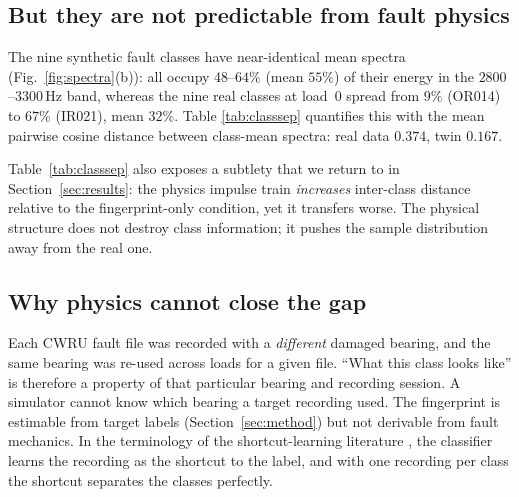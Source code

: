 \documentclass[preprint,12pt]{elsarticle}
\begin{document}
\subsection{But they are not predictable from fault physics}
The nine synthetic fault classes have near-identical mean spectra
(Fig.~\ref{fig:spectra}(b)): all occupy
$48$--$64\%$ (mean $55\%$) of their energy in the $2800$--$3300$\,Hz band,
whereas the nine real classes at load~0 spread from $9\%$ (OR014) to $67\%$
(IR021), mean $32\%$. Table
\ref{tab:classsep} quantifies this with the mean pairwise cosine distance
between class-mean spectra: real data $0.374$, twin $0.167$.

\begin{table}[t]
\centering
\caption{Mean pairwise cosine distance between class-mean magnitude spectra
(higher = classes better separated). Target load~3.}
\label{tab:classsep}
\small
{}
\end{table}

Table~\ref{tab:classsep} also exposes a subtlety that we return to in
Section~\ref{sec:results}: the physics impulse train \emph{increases}
inter-class distance relative to the fingerprint-only condition, yet it
transfers worse. The physical structure does not destroy class information; it
pushes the sample distribution away from the real one.

\subsection{Why physics cannot close the gap}
Each CWRU fault file was recorded with a \emph{different} damaged bearing, and
the same bearing was re-used across loads for a given file. ``What this class
looks like'' is therefore a property of that particular bearing and recording
session. A simulator cannot know which bearing a target recording used. The
fingerprint is estimable from target labels (Section~\ref{sec:method}) but not
derivable from fault mechanics. In the terminology of the shortcut-learning
literature \cite{geirhos2020shortcut}, the classifier learns the recording as
the shortcut to the label, and with one recording per class the shortcut
separates the classes perfectly.
\end{document}
